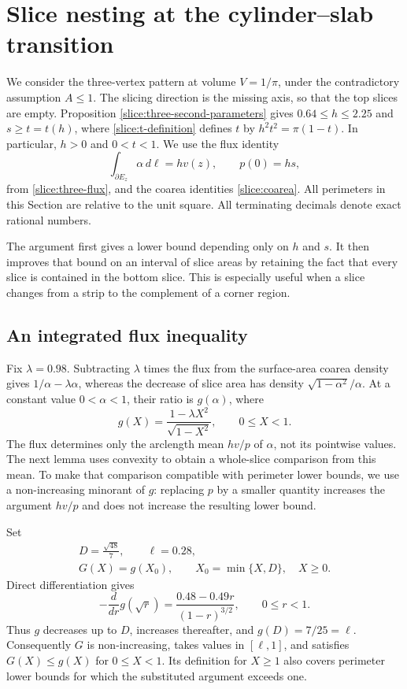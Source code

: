 \section{Slice nesting at the cylinder--slab transition}
\label{nest:section}

We consider the three-vertex pattern at volume $V=1/\pi$, under the
contradictory assumption $A\leq1$.  The slicing direction is the missing
axis, so that the top slices are empty.  Proposition
\ref{slice:three-second-parameters} gives
$0.64\leq h\leq2.25$ and $s\geq t=t(h)$, where
\eqref{slice:t-definition} defines $t$ by
$h^2t^2=\pi(1-t)$.  In particular, $h>0$ and $0<t<1$.
We use the flux identity
\[
 \int_{\partial E_z}\alpha\,d\ell=hv(z),\qquad p(0)=hs,
\]
from \eqref{slice:three-flux}, and the coarea identities
\eqref{slice:coarea}.  All perimeters in this Section are relative to the
unit square.  All terminating decimals denote exact rational numbers.

The argument first gives a lower bound depending only on $h$ and $s$.
It then improves that bound on an interval of slice areas by retaining
the fact that every slice is contained in the bottom slice.  This is
especially useful when a slice changes from a strip to the complement
of a corner region.

\subsection{An integrated flux inequality}

Fix $\lambda=0.98$. Subtracting $\lambda$ times the flux from the
surface-area coarea density gives $1/\alpha-\lambda\alpha$, whereas the
decrease of slice area has density $\sqrt{1-\alpha^2}/\alpha$.
At a constant value $0<\alpha<1$, their ratio is $g(\alpha)$, where
\[
 g(X)=\frac{1-\lambda X^2}{\sqrt{1-X^2}},\qquad 0\leq X<1.
\]
The flux determines only the arclength mean $hv/p$ of $\alpha$,
not its pointwise values. The next lemma uses convexity to obtain
a whole-slice comparison from this mean. To make that comparison
compatible with perimeter lower bounds, we use a non-increasing
minorant of $g$: replacing $p$ by a smaller quantity increases
the argument $hv/p$ and does not increase the resulting lower bound.

Set
\begin{equation}\label{nest:weight}
 \begin{gathered}
 D=\frac{\sqrt{48}}7,\qquad \ell=0.28,\\
 G(X)=g(X_0),\qquad X_0=\min\{X,D\},\quad X\geq0.
 \end{gathered}
\end{equation}
Direct differentiation gives
\begin{equation}\label{nest:weight-derivative}
 -\frac{d}{dr}g(\sqrt r)
   =\frac{0.48-0.49r}{(1-r)^{3/2}},\qquad 0\leq r<1.
\end{equation}
Thus $g$ decreases up to $D$, increases thereafter, and
$g(D)=7/25=\ell$.  Consequently $G$ is non-increasing, takes values
in $[\ell,1]$, and satisfies $G(X)\leq g(X)$ for $0\leq X<1$.
Its definition for $X\geq1$ also covers perimeter lower bounds
for which the substituted argument exceeds one.

